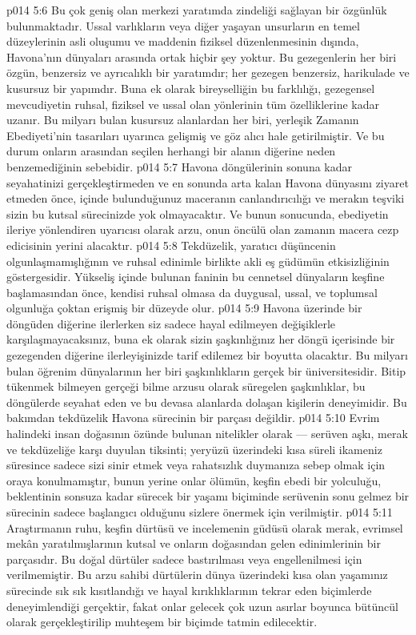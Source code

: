 \vs p014 5:6 Bu çok geniş olan merkezi yaratımda zindeliği sağlayan bir özgünlük bulunmaktadır. Ussal varlıkların veya diğer yaşayan unsurların en temel düzeylerinin asli oluşumu ve maddenin fiziksel düzenlenmesinin dışında, Havona’nın dünyaları arasında ortak hiçbir şey yoktur. Bu gezegenlerin her biri özgün, benzersiz ve ayrıcalıklı bir yaratımdır; her gezegen benzersiz, harikulade ve kusursuz bir yapımdır. Buna ek olarak bireyselliğin bu farklılığı, gezegensel mevcudiyetin ruhsal, fiziksel ve ussal olan yönlerinin tüm özelliklerine kadar uzanır. Bu milyarı bulan kusursuz alanlardan her biri, yerleşik Zamanın Ebediyeti’nin tasarıları uyarınca gelişmiş ve göz alıcı hale getirilmiştir. Ve bu durum onların arasından seçilen herhangi bir alanın diğerine neden benzemediğinin sebebidir.
\vs p014 5:7 Havona döngülerinin sonuna kadar seyahatinizi gerçekleştirmeden ve en sonunda arta kalan Havona dünyasını ziyaret etmeden önce, içinde bulunduğunuz maceranın canlandırıcılığı ve merakın teşviki sizin bu kutsal sürecinizde yok olmayacaktır. Ve bunun sonucunda, ebediyetin ileriye yönlendiren uyarıcısı olarak arzu, onun öncülü olan zamanın macera cezp edicisinin yerini alacaktır.
\vs p014 5:8 Tekdüzelik, yaratıcı düşüncenin olgunlaşmamışlığının ve ruhsal edinimle birlikte akli eş güdümün etkisizliğinin göstergesidir. Yükseliş içinde bulunan faninin bu cennetsel dünyaların keşfine başlamasından önce, kendisi ruhsal olmasa da duygusal, ussal, ve toplumsal olgunluğa çoktan erişmiş bir düzeyde olur.
\vs p014 5:9 Havona üzerinde bir döngüden diğerine ilerlerken siz sadece hayal edilmeyen değişiklerle karşılaşmayacaksınız, buna ek olarak sizin şaşkınlığınız her döngü içerisinde bir gezegenden diğerine ilerleyişinizde tarif edilemez bir boyutta olacaktır. Bu milyarı bulan öğrenim dünyalarının her biri şaşkınlıkların gerçek bir üniversitesidir. Bitip tükenmek bilmeyen gerçeği bilme arzusu olarak süregelen şaşkınlıklar, bu döngülerde seyahat eden ve bu devasa alanlarda dolaşan kişilerin deneyimidir. Bu bakımdan tekdüzelik Havona sürecinin bir parçası değildir.
\vs p014 5:10 Evrim halindeki insan doğasının özünde bulunan nitelikler olarak --- serüven aşkı, merak ve tekdüzeliğe karşı duyulan tiksinti; yeryüzü üzerindeki kısa süreli ikameniz süresince sadece sizi sinir etmek veya rahatsızlık duymanıza sebep olmak için oraya konulmamıştır, bunun yerine onlar ölümün, keşfin ebedi bir yolculuğu, beklentinin sonsuza kadar sürecek bir yaşamı biçiminde serüvenin sonu gelmez bir sürecinin sadece başlangıcı olduğunu sizlere önermek için verilmiştir.
\vs p014 5:11 Araştırmanın ruhu, keşfin dürtüsü ve incelemenin güdüsü olarak merak, evrimsel mekân yaratılmışlarının kutsal ve onların doğasından gelen edinimlerinin bir parçasıdır. Bu doğal dürtüler sadece bastırılması veya engellenilmesi için verilmemiştir. Bu arzu sahibi dürtülerin dünya üzerindeki kısa olan yaşamınız sürecinde sık sık kısıtlandığı ve hayal kırıklıklarının tekrar eden biçimlerde deneyimlendiği gerçektir, fakat onlar gelecek çok uzun asırlar boyunca bütüncül olarak gerçekleştirilip muhteşem bir biçimde tatmin edilecektir.
